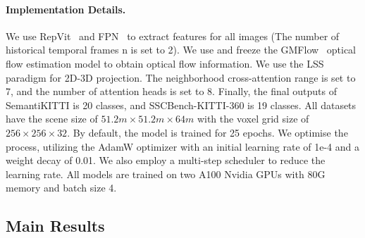\paragraph{Implementation Details.} 
We use RepVit~\cite{wang2023repvit} and FPN~\cite{lin2017feature} to extract features for all images (The number of historical temporal frames n is set to 2).
We use and freeze the GMFlow~\cite{xu2022gmflow} optical flow estimation model to obtain optical flow information.
We use the LSS paradigm for 2D-3D projection. The neighborhood cross-attention range is set to 7, and the number of attention heads is set to 8. Finally, the final outputs of SemantiKITTI is 20 classes, and SSCBench-KITTI-360 is 19 classes. All datasets have the scene size of $51.2m \times 51.2m \times 64m$ with the voxel grid size of $256 \times 256 \times 32$. By default, the model is trained for 25 epochs. We optimise the process, utilizing the AdamW optimizer with an initial learning rate of 1e-4 and a weight decay of 0.01. We also employ a multi-step scheduler to reduce the learning rate. All models are trained on two A100 Nvidia GPUs with 80G memory and batch size 4.

\subsection{Main Results}
\vspace{-4mm}
